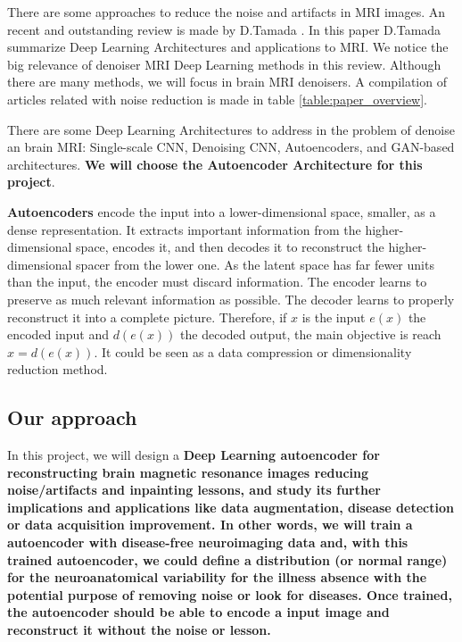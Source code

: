 There are some approaches to reduce the noise and artifacts in MRI images. An recent and outstanding review is made by D.Tamada \cite{tamada2020review}. In this paper D.Tamada summarize Deep Learning Architectures and applications to MRI. We notice the big relevance of denoiser MRI Deep Learning methods in this review. Although there are many methods, we will focus in brain MRI denoisers. A compilation of articles related with noise reduction is made in table \ref{table:paper_overview}.

There are some Deep Learning Architectures to address in the problem of denoise an brain MRI: Single-scale CNN, Denoising CNN, Autoencoders, and GAN-based architectures. \textbf{We will choose the Autoencoder Architecture for this project}.

\textbf{Autoencoders} \cite{autoencoder} encode the input into a lower-dimensional space, smaller, as a dense representation. It extracts important information from the higher-dimensional space, encodes it, and then decodes it to reconstruct the higher-dimensional spacer from the lower one. As the latent space has far fewer units than the input, the encoder must discard information. The encoder learns to preserve as much relevant information as possible. The decoder learns to properly reconstruct it into a complete picture. Therefore, if $x$ is the input $e(x)$ the encoded input and $d(e(x))$ the decoded output, the main objective is reach $x=d(e(x))$. It could be seen as a data compression or dimensionality reduction method.


\subsection{Our approach}

\begin{tcolorbox}
In this project, we will design a \textbf{Deep Learning autoencoder for reconstructing brain magnetic resonance images reducing noise/artifacts and inpainting lessons, and study its further implications and applications like  data augmentation, disease detection or data acquisition improvement. In other words, we will train a autoencoder with disease-free neuroimaging data and, with this trained autoencoder, we could define a distribution (or normal range) for the neuroanatomical variability for the illness absence with the potential purpose of removing noise or look for diseases. Once trained, the autoencoder should be able to encode a input image and reconstruct it without the noise or lesson.}
\end{tcolorbox}

